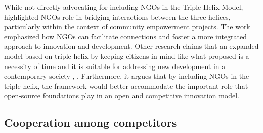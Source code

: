 \documentclass[CHICAGO,Times1COL]{WileyNJDv5} %
\begin{document}
While not directly advocating for including NGOs in the Triple Helix Model,  \citet{SIANIPAR2012197} highlighted NGOs role in bridging interactions between the three helices, particularly within the context of community empowerment projects. The work emphasized how NGOs can facilitate connections and foster a more integrated approach to innovation and development.  Other research claims that an expanded model based on triple helix by keeping citizens in mind like what \citet{doi:10.1504/IJTM.2009.023374} proposed is a necessity of time and it is suitable for addressing new development in a contemporary society \citet{growthquadruple},  \citet{miller2018systematic}.  Furthermore, it argues that by including NGOs in the triple-helix, the framework would better accommodate the important role that open-source foundations play in an open and competitive innovation model.

%


 
\subsection{Cooperation among competitors}

%
%
%
%
%
%
%
%
\end{document}
